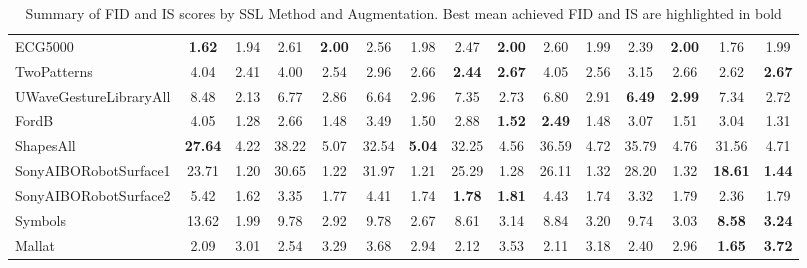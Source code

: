 \documentclass[../../thesis.tex]{subfiles}
\begin{document}
\begin{table}[h]
\begin{adjustbox}{width=\textwidth}
\begin{tabular}{lcc|cc|cc|cc|cc|cc|cc}
        ECG5000                 & \textbf{1.62} & 1.94 & 2.61 & \textbf{2.00} & 2.56 & 1.98 & 2.47 & \textbf{2.00} & 2.60 & 1.99 & 2.39 & \textbf{2.00} & 1.76 & 1.99 \\
        TwoPatterns             & 4.04 & 2.41 & 4.00 & 2.54 & 2.96 & 2.66 & \textbf{2.44} & \textbf{2.67} & 4.05 & 2.56 & 3.15 & 2.66 & 2.62 & \textbf{2.67} \\
        UWaveGestureLibraryAll  & 8.48 & 2.13 & 6.77 & 2.86 & 6.64 & 2.96 & 7.35 & 2.73 & 6.80 & 2.91 & \textbf{6.49} & \textbf{2.99} & 7.34 & 2.72 \\
        FordB                   & 4.05 & 1.28 & 2.66 & 1.48 & 3.49 & 1.50 & 2.88 & \textbf{1.52} & \textbf{2.49} & 1.48 & 3.07 & 1.51 & 3.04 & 1.31 \\
        ShapesAll               & \textbf{27.64} & 4.22 & 38.22 & 5.07 & 32.54 & \textbf{5.04} & 32.25 & 4.56 & 36.59 & 4.72 & 35.79 & 4.76 & 31.56 & 4.71 \\
        SonyAIBORobotSurface1   & 23.71 & 1.20 & 30.65 & 1.22 & 31.97 & 1.21 & 25.29 & 1.28 & 26.11 & 1.32 & 28.20 & 1.32 & \textbf{18.61} & \textbf{1.44} \\
        SonyAIBORobotSurface2   & 5.42 & 1.62 & 3.35 & 1.77 & 4.41 & 1.74 & \textbf{1.78} & \textbf{1.81} & 4.43 & 1.74 & 3.32 & 1.79 & 2.36 & 1.79 \\
        Symbols                 & 13.62 & 1.99 & 9.78 & 2.92 & 9.78 & 2.67 & 8.61 & 3.14 & 8.84 & 3.20 & 9.74 & 3.03 & \textbf{8.58} & \textbf{3.24} \\
        Mallat                  & 2.09 & 3.01 & 2.54 & 3.29 & 3.68 & 2.94 & 2.12 & 3.53 & 2.11 & 3.18 & 2.40 & 2.96 & \textbf{1.65} & \textbf{3.72} \\
        \bottomrule
    \end{tabular}
    \end{adjustbox}
    \caption{Summary of FID and IS scores by SSL Method and Augmentation. Best mean achieved FID and IS are highlighted in bold}
    \label{tab:FID_IS_mean}
\end{table}
\end{document}
